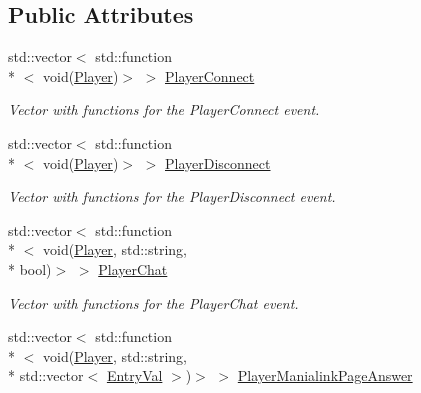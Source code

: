 \subsection*{Public Attributes}
\begin{DoxyCompactItemize}
\item 
\hypertarget{classPlugin_a02e032f548c5a002496ab6b02788342b}{std\-::vector$<$ std\-::function\\*
$<$ void(\hyperlink{structPlayer}{Player})$>$ $>$ \hyperlink{classPlugin_a02e032f548c5a002496ab6b02788342b}{Player\-Connect}}\label{classPlugin_a02e032f548c5a002496ab6b02788342b}

\begin{DoxyCompactList}\small\item\em Vector with functions for the Player\-Connect event. \end{DoxyCompactList}\item 
\hypertarget{classPlugin_a3c8dec90190a888e951268b3727b7573}{std\-::vector$<$ std\-::function\\*
$<$ void(\hyperlink{structPlayer}{Player})$>$ $>$ \hyperlink{classPlugin_a3c8dec90190a888e951268b3727b7573}{Player\-Disconnect}}\label{classPlugin_a3c8dec90190a888e951268b3727b7573}

\begin{DoxyCompactList}\small\item\em Vector with functions for the Player\-Disconnect event. \end{DoxyCompactList}\item 
\hypertarget{classPlugin_a17096b73a575eef7c4e8c5380c08f670}{std\-::vector$<$ std\-::function\\*
$<$ void(\hyperlink{structPlayer}{Player}, std\-::string, \\*
bool)$>$ $>$ \hyperlink{classPlugin_a17096b73a575eef7c4e8c5380c08f670}{Player\-Chat}}\label{classPlugin_a17096b73a575eef7c4e8c5380c08f670}

\begin{DoxyCompactList}\small\item\em Vector with functions for the Player\-Chat event. \end{DoxyCompactList}\item 
\hypertarget{classPlugin_aec9eb757d9baae48942b34f28594a2a6}{std\-::vector$<$ std\-::function\\*
$<$ void(\hyperlink{structPlayer}{Player}, std\-::string, \\*
std\-::vector$<$ \hyperlink{structEntryVal}{Entry\-Val} $>$)$>$ $>$ \hyperlink{classPlugin_aec9eb757d9baae48942b34f28594a2a6}{Player\-Manialink\-Page\-Answer}}\label{classPlugin_aec9eb757d9baae48942b34f28594a2a6}


\end{DoxyCompactItemize}
